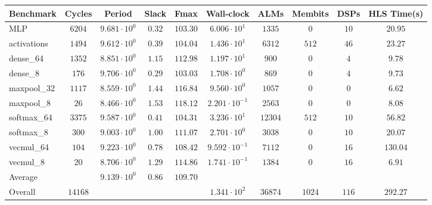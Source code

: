 \begin{tabular}{|l|c|c|c|c|c|c|c|c|c|}
\hline
Benchmark   & Cycles    & Period                 & Slack    & Fmax       & Wall-clock              & ALMs      & Membits  & DSPs    & HLS Time(s) \\
\hline
MLP         & $ 6204  $ & $ 9.681 \cdot 10^{0} $ & $ 0.32 $ & $ 103.30 $ & $ 6.006 \cdot 10^{1}  $ & $ 1335  $ & $ 0    $ & $ 10  $ & $ 20.95   $ \\
activations & $ 1494  $ & $ 9.612 \cdot 10^{0} $ & $ 0.39 $ & $ 104.04 $ & $ 1.436 \cdot 10^{1}  $ & $ 6312  $ & $ 512  $ & $ 46  $ & $ 23.27   $ \\
dense\_64   & $ 1352  $ & $ 8.851 \cdot 10^{0} $ & $ 1.15 $ & $ 112.98 $ & $ 1.197 \cdot 10^{1}  $ & $ 900   $ & $ 0    $ & $ 4   $ & $ 9.78    $ \\
dense\_8    & $ 176   $ & $ 9.706 \cdot 10^{0} $ & $ 0.29 $ & $ 103.03 $ & $ 1.708 \cdot 10^{0}  $ & $ 869   $ & $ 0    $ & $ 4   $ & $ 9.73    $ \\
maxpool\_32 & $ 1117  $ & $ 8.559 \cdot 10^{0} $ & $ 1.44 $ & $ 116.84 $ & $ 9.560 \cdot 10^{0}  $ & $ 1057  $ & $ 0    $ & $ 0   $ & $ 6.62    $ \\
maxpool\_8  & $ 26    $ & $ 8.466 \cdot 10^{0} $ & $ 1.53 $ & $ 118.12 $ & $ 2.201 \cdot 10^{-1} $ & $ 2563  $ & $ 0    $ & $ 0   $ & $ 8.08    $ \\
softmax\_64 & $ 3375  $ & $ 9.587 \cdot 10^{0} $ & $ 0.41 $ & $ 104.31 $ & $ 3.236 \cdot 10^{1}  $ & $ 12304 $ & $ 512  $ & $ 10  $ & $ 56.82   $ \\
softmax\_8  & $ 300   $ & $ 9.003 \cdot 10^{0} $ & $ 1.00 $ & $ 111.07 $ & $ 2.701 \cdot 10^{0}  $ & $ 3038  $ & $ 0    $ & $ 10  $ & $ 20.07   $ \\
vecmul\_64  & $ 104   $ & $ 9.223 \cdot 10^{0} $ & $ 0.78 $ & $ 108.42 $ & $ 9.592 \cdot 10^{-1} $ & $ 7112  $ & $ 0    $ & $ 16  $ & $ 130.04  $ \\
vecmul\_8   & $ 20    $ & $ 8.706 \cdot 10^{0} $ & $ 1.29 $ & $ 114.86 $ & $ 1.741 \cdot 10^{-1} $ & $ 1384  $ & $ 0    $ & $ 16  $ & $ 6.91    $ \\
\hline
Average     & $       $ & $ 9.139 \cdot 10^{0} $ & $ 0.86 $ & $ 109.70 $ & $                     $ & $       $ & $      $ & $     $ & $         $ \\
\hline
Overall     & $ 14168 $ & $                    $ & $      $ & $        $ & $ 1.341 \cdot 10^{2}  $ & $ 36874 $ & $ 1024 $ & $ 116 $ & $ 292.27  $ \\
\hline
\end{tabular}
